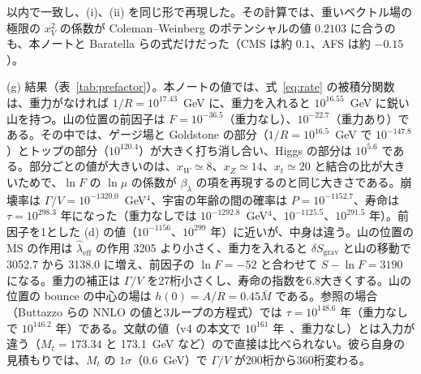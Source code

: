 \documentclass[a4paper,10pt]{ltjsarticle}
\newcommand{\MSbar}{\overline{\mathrm{MS}}}
\begin{document}
以内で一致し、(i)、(ii) を同じ形で再現した。その計算では、重いベクトル場の極限の $x_V^2$ の係数が Coleman--Weinberg のポテンシャルの値 $0.2103$ に合うのも、本ノートと Baratella らの式だけだった（CMS は約 $0.1$、AFS は約 $-0.15$）。

(g) 結果（表~\ref{tab:prefactor}）。本ノートの値では、式~\eqref{eq:rate} の被積分関数は、重力がなければ $1/R=10^{17.43}$~GeV に、重力を入れると $10^{16.55}$~GeV に鋭い山を持つ。山の位置の前因子は $F=10^{-36.5}$（重力なし）、$10^{-22.7}$（重力あり）である。その中では、ゲージ場と Goldstone の部分（$1/R=10^{16.5}$~GeV で $10^{-147.8}$）とトップの部分（$10^{120.4}$）が大きく打ち消し合い、Higgs の部分は $10^{5.6}$ である。部分ごとの値が大きいのは、$x_W\simeq8$、$x_Z\simeq14$、$x_t\simeq20$ と結合の比が大きいためで、$\ln F$ の $\ln\mu$ の係数が $\beta_\lambda$ の項を再現するのと同じ大きさである。崩壊率は $\Gamma/V=10^{-1320.0}$~GeV$^4$、宇宙の年齢の間の確率は $P=10^{-1152.7}$、寿命は $\tau=10^{298.3}$ 年になった（重力なしでは $10^{-1292.8}$~GeV$^4$、$10^{-1125.5}$、$10^{291.5}$ 年）。前因子を1とした (d) の値（$10^{-1156}$、$10^{299}$ 年）に近いが、中身は違う。山の位置の $\MSbar$ の作用は $\hat\lambda_{\mathrm{eff}}$ の作用 3205 より小さく、重力を入れると $\delta S_{\mathrm{grav}}$ と山の移動で 3052.7 から 3138.0 に増え、前因子の $\ln F=-52$ と合わせて $S-\ln F=3190$ になる。重力の補正は $\Gamma/V$ を27桁小さくし、寿命の指数を6.8大きくする。山の位置の bounce の中心の場は $h(0)=A/R=0.45\bar M$ である。参照の場合（Buttazzo らの NNLO の値と3ループの方程式）では $\tau=10^{148.6}$ 年（重力なしで $10^{146.2}$ 年）である。文献の値（v4 の本文で $10^{161}$ 年~\cite{afs18}、重力なし）とは入力が違う（$M_t=173.34$ と 173.1~GeV など）ので直接は比べられない。彼ら自身の見積もりでは、$M_t$ の $1\sigma$（0.6~GeV）で $\Gamma/V$ が200桁から360桁変わる。
\end{document}
